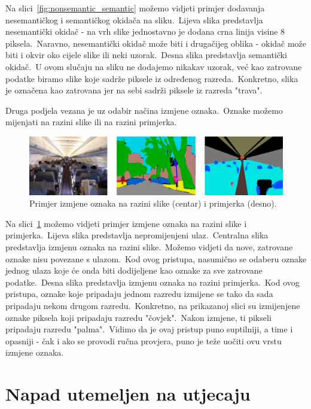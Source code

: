 \documentclass[times, utf8, seminar, numeric]{fer}
\begin{document}
Na slici~\ref{fig:nonsemantic_semantic} možemo vidjeti primjer dodavanja nesemantičkog i semantičkog okidača na sliku.\ 
Lijeva slika predstavlja nesemantički okidač - na vrh slike jednostavno je dodana crna linija visine 8 piksela.\ 
Naravno, nesemantički okidač može biti i drugačijeg oblika - okidač može biti i okvir oko cijele slike ili neki uzorak.\
Desna slika predstavlja semantički okidač.\ U ovom slučaju na sliku ne dodajemo nikakav uzorak, već kao zatrovane podatke biramo slike koje sadrže piksele iz određenog razreda.\ 
Konkretno, slika je označena kao zatrovana jer na sebi sadrži piksele iz razreda "trava".\ 
  
Druga podjela vezana je uz odabir načina izmjene oznaka.\ Oznake možemo mijenjati na razini slike ili na razini primjerka.\ 

\begin{figure}[htb]
    \centering
    \includegraphics[scale=0.45]{./Slike/badnets_finegrained.png}
    \caption{Primjer izmjene oznaka na razini slike (centar) i primjerka (desno).}
    \label{fig:badnets_finegrained}
\end{figure}

Na slici~\ref{fig:badnets_finegrained} možemo vidjeti primjer izmjene oznaka na razini slike i primjerka.\
Lijeva slika predstavlja nepromijenjeni ulaz.\ Centralna slika predstavlja izmjenu oznaka na razini slike.\ 
Možemo vidjeti da nove, zatrovane oznake nisu povezane s ulazom.\ Kod ovog pristupa, nasumično se odaberu oznake jednog ulaza koje će onda biti dodijeljene kao oznake za sve zatrovane podatke.\
Desna slika predstavlja izmjenu oznaka na razini primjerka.\ Kod ovog pristupa, oznake koje pripadaju jednom razredu izmijene se tako da sada pripadaju nekom drugom razredu.\ 
Konkretno, na prikazanoj slici su izmijenjene oznake piksela koji pripadaju razredu "čovjek".\ Nakon izmjene, ti pikseli pripadaju razredu "palma".\
Vidimo da je ovaj pristup puno suptilniji, a time i opasniji - čak i ako se provodi ručna provjera, puno je teže uočiti ovu vrstu izmjene oznaka.\

\section{Napad utemeljen na utjecaju}
\end{document}
